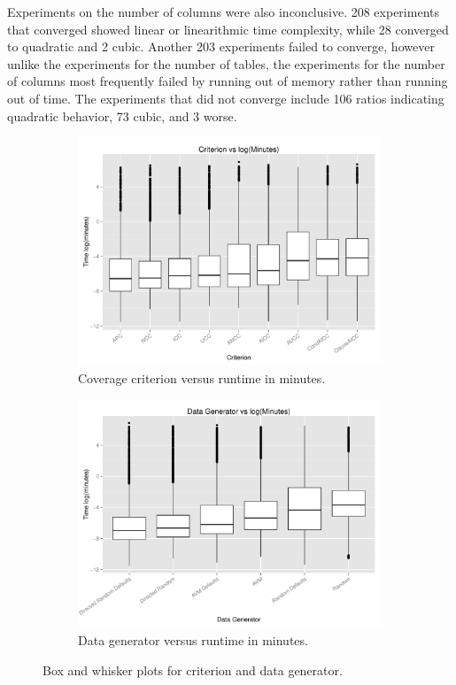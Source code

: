 Experiments on the number of columns were also inconclusive.  208 experiments that converged showed linear or
linearithmic time complexity, while 28 converged to quadratic and 2 cubic.  Another 203 experiments failed to converge,
however unlike the experiments for the number of tables, the experiments for the number of columns most frequently
failed by running out of memory rather than running out of time. The experiments that did not converge include 106
ratios indicating quadratic behavior, 73 cubic, and 3 worse.


\begin{figure}[t!]
\centering
\begin{subfigure}{0.5\textwidth}
  \centering
  \includegraphics[width=1\linewidth]{diagrams/CriterionOrder.pdf}
  \caption{Coverage criterion versus runtime in minutes.}
  \label{fig:crites}
\end{subfigure}%
\begin{subfigure}{0.5\textwidth}
  \centering
  \includegraphics[width=1\linewidth]{diagrams/DataGeneratorOrder.pdf}
  \caption{Data generator versus runtime in minutes.}
  \label{fig:datas}
\end{subfigure}
\label{fig:bwplots}
\caption{Box and whisker plots for criterion and data
  generator.}
\end{figure}

